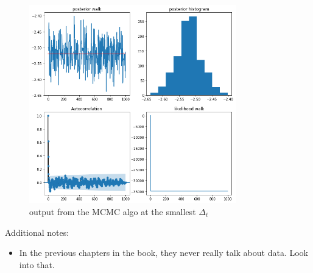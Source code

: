 \documentclass{amsart}
\numberwithin{equation}{section}
\numberwithin{table}{section}
\numberwithin{figure}{section}
\theoremstyle{plain}
\theoremstyle{definition}
\theoremstyle{remark}
\begin{document}
\begin{todolist}
\begin{itemize}
     \begin{figure}[H]
      \centering
      \includegraphics[width=0.8\textwidth]{CODE/mcmcoutput.png}
      \caption{output from the MCMC algo at the smallest $\Delta_t$}
    \end{figure}
  \end{itemize}

\end{todolist}

Additional notes:
\begin{itemize}
\item In the previous chapters in the book, they never really talk about data. Look into that.
\end{itemize}
\end{document}
